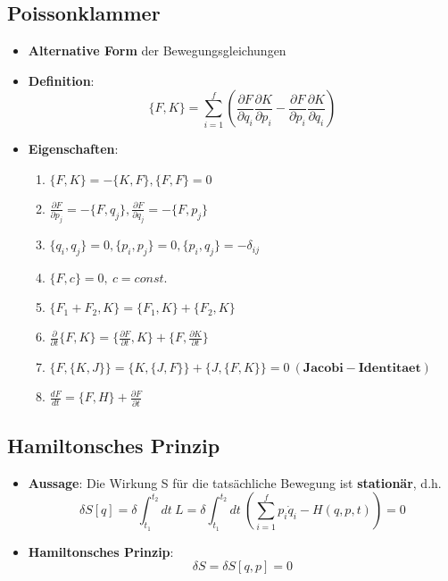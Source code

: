 \subsection{Poissonklammer}
\label{hform:sub:poissonklammer}

\begin{itemize}
	\item \textbf{Alternative Form} der Bewegungsgleichungen
	\item \textbf{Definition}:
	$$
		\{F, K\} = \sum^f_{i=1}(\frac{\partial F}{\partial q_i}\frac{\partial K}{\partial p_i} - \frac{\partial F}{\partial p_i}\frac{\partial K}{\partial q_i})
	$$
	\newpage
	\item \textbf{Eigenschaften}:
	\begin{enumerate}
		\item $\{F, K\} = -\{K, F\}, \{F, F\} = 0$
		\item $\frac{\partial F}{\partial p_j} = -\{F, q_j\}, \frac{\partial F}{\partial q_j} = -\{F, p_j\}$
		\item $\{q_i, q_j\} = 0, \{p_i, p_j\} = 0, \{p_i, q_j\} = -\delta_{ij}$
		\item $\{F, c\} = 0,\ c = const.$
		\item $\{F_1 + F_2, K\} = \{F_1, K\} + \{F_2, K\}$
		\item $\frac{\partial}{\partial t}\{F, K\} = \{\frac{\partial F}{\partial t}, K\} + \{F, \frac{\partial K}{\partial t}\}$
		\item $\{F, \{K, J\}\} = \{K, \{J, F\}\} + \{J, \{F, K\}\} = 0\ (\mathbf{Jacobi-Identitaet})$
		\item $\frac{dF}{dt} = \{F, H\} + \frac{\partial F}{\partial t}$
	\end{enumerate}
\end{itemize}

\subsection{Hamiltonsches Prinzip}
\label{hform:sub:hamiltonsches_prinzip}

\begin{itemize}
	\item \textbf{Aussage}: Die Wirkung S für die tatsächliche Bewegung ist \textbf{stationär}, d.h.
	$$
		\delta S[q] = \delta \int^{t_2}_{t_1}dt\ L = \delta \int^{t_2}_{t_1}dt\ (\sum^f_{i=1}p_i\dot{q}_i - H(q, p, t)) = 0
	$$
	\item \textbf{Hamiltonsches Prinzip}:
	$$
		\delta S = \delta S[q, p] = 0
	$$
\end{itemize}


